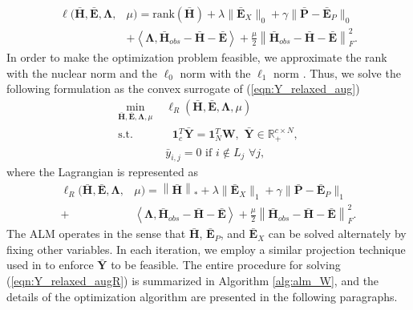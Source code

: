 \documentclass[10pt,journal,compsoc]{IEEEtran}
\begin{document}
\begin{equation}
\begin{aligned}
\ell  (\bar{\mathbf{H}},\bar{\mathbf{E}}, \mathbf{\Lambda},& \mu) = \mathrm{rank} (
\bar{\mathbf{H}}) + \lambda \|\bar{\mathbf{E}}_X\|_0  +  \gamma \|\bar{\mathbf{P}} -\bar{\mathbf{E}}_P\|_0 \\
& + \left\langle  \mathbf{\Lambda} ,
\bar{\mathbf{H}}_{obs} - \bar{\mathbf{H}}
-
\bar{\mathbf{E}}
\right\rangle  + \frac{\mu}{2} \left\|
\bar{\mathbf{H}}_{obs} - \bar{\mathbf{H}}  -
\bar{\mathbf{E}}
 \right\|_F^2.
\end{aligned}\label{eqn:L}
\end{equation}
In order to make the optimization problem feasible, we approximate the rank with the nuclear norm and the $\ell_{0}$ norm with the $\ell_{1}$ norm \cite{Candes_matrixcompletion}.  Thus, we solve the following formulation as the convex surrogate of (\ref{eqn:Y_relaxed_aug})
\begin{align}
\min_{\bar{\mathbf{H}},\bar{\mathbf{E}}, \mathbf{\Lambda}, \mu} \,\,& \ell_R  (\bar{\mathbf{H}},\bar{\mathbf{E}}, \mathbf{\Lambda}, \mu) \label{eqn:Y_relaxed_augR} \\
\text{s.t.}
&\,\, \; \mathbf{1}^T_c \bar{\mathbf{Y}} = \mathbf{1}^T_N \mathbf{W}, \,\, \bar{\mathbf{Y}} \in \mathbb{R}_+^{c \times N}, \label{cond:probsim1} \\
& \bar{y}_{i,j} = 0 \,\, \mathrm{if} \,\, i \notin L_j \,\, \forall j,\label{cond:al1}
\end{align}
where the Lagrangian is represented as
\begin{equation}
\begin{aligned}
\ell_R   (\bar{\mathbf{H}},\bar{\mathbf{E}}, \mathbf{\Lambda},& \mu) =
 \left\| \bar{\mathbf{H}} \right\|_* + \lambda \|\bar{\mathbf{E}}_X\|_1  +  \gamma \|\bar{\mathbf{P}} - \bar{\mathbf{E}}_P\|_1 \\
 +& \left \langle  \mathbf{\Lambda} ,
\bar{\mathbf{H}}_{obs} -
\bar{\mathbf{H}}
-
\bar{\mathbf{E}}
 \right \rangle  + \frac{\mu}{2} \left\|
\bar{\mathbf{H}}_{obs} - \bar{\mathbf{H}}
-
\bar{\mathbf{E}}
\right\|_F^2.
\end{aligned}\label{eqn:LR}
\end{equation}
The ALM operates in the sense that $\bar{\mathbf{H}}$, $\bar{\mathbf{E}}_P$, and $\bar{\mathbf{E}}_X$ can be solved alternately by fixing other variables. In each iteration, we employ a similar projection technique used in \cite{Goldberg2010,Cabral2011} to enforce $\bar{\mathbf{Y}}$ to be feasible.
The entire procedure for solving (\ref{eqn:Y_relaxed_augR}) is summarized in Algorithm \ref{alg:alm_W}, and the details of the optimization algorithm are presented in the following paragraphs.
\end{document}
